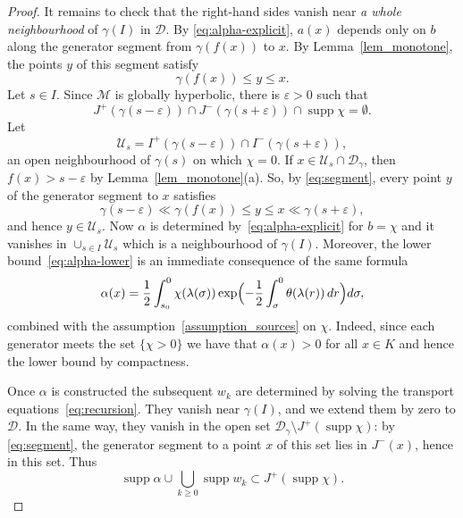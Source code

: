 \documentclass[12pt,reqno]{amsart}
\numberwithin{equation}{section}
\theoremstyle{definition}
\theoremstyle{plain}
\theoremstyle{definition}
\theoremstyle{definition}
\newcommand{\M}{\mathcal{M}}
\newcommand{\D}{\mathcal{D}}
\newcommand{\dg}{\D_\gamma}
\DeclareMathOperator{\supp}{supp}
\begin{document}
\begin{proof}
It remains to check that the right-hand sides vanish near \textit{a whole neighbourhood} of $\gamma(I)$ in $\mathcal{D}$. By \eqref{eq:alpha-explicit}, $a(x)$ depends only on $b$ along the generator segment from $\gamma(f(x))$ to $x$. By Lemma~\ref{lem_monotone}, the points $y$ of this segment satisfy
\begin{equation}\label{eq:segment}
\gamma(f(x))\le y\le x .
\end{equation}
Let $s\in I$. Since $\M$ is globally hyperbolic, there is $\varepsilon>0$ such that
\begin{equation*}
J^+(\gamma(s-\varepsilon))\cap J^-(\gamma(s+\varepsilon))\cap\supp\chi=\emptyset .
\end{equation*}
Let
\begin{equation*}
\mathcal U_s=I^+(\gamma(s-\varepsilon))\cap I^-(\gamma(s+\varepsilon)),
\end{equation*}
an open neighbourhood of $\gamma(s)$ on which $\chi=0$. If $x\in\mathcal U_s\cap\dg$, then $f(x)>s-\varepsilon$ by Lemma~\ref{lem_monotone}(a). So, by \eqref{eq:segment}, every point $y$ of the generator segment to $x$ satisfies
\begin{equation*}
\gamma(s-\varepsilon)\ll\gamma(f(x))\le y\le x\ll\gamma(s+\varepsilon),
\end{equation*}
and hence $y\in\mathcal U_s$. Now $\alpha$ is determined by~\eqref{eq:alpha-explicit} for $b=\chi$ and it vanishes in $\cup_{s \in I} \mathcal U _s$ which is a neighbourhood of $\gamma(I)$. Moreover, the lower bound~\eqref{eq:alpha-lower} is an immediate consequence of the same formula
\begin{equation*}
\alpha(x)=\frac12\int_{s_0}^{0}\chi(\lambda(\sigma))\exp\Bigl(-\frac12\int_\sigma^0\theta(\lambda(r))\,dr\Bigr)d\sigma,
\end{equation*}
combined with the assumption~\ref{assumption_sources} on $\chi$. Indeed, since each generator meets the set $\{\chi >0\}$ we have that $\alpha(x)>0$ for all $x \in K$ and hence the lower bound by compactness.



Once $\alpha$ is constructed the subsequent $w_k$ are determined by solving the transport equations~\eqref{eq:recursion}. They vanish near $\gamma(I)$, and we extend them by zero to $\D$. In the same way, they vanish in the open set $\dg\setminus J^+(\supp\chi)$: by \eqref{eq:segment}, the generator segment to a point $x$ of this set lies in $J^-(x)$, hence in this set. Thus
\begin{equation*}
\supp\alpha\cup\bigcup_{k\ge0}\supp w_k\subset J^+(\supp\chi).
\end{equation*}




\end{proof}
\end{document}
